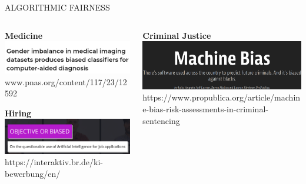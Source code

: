 \documentclass[11pt,compress,t,notes=noshow, xcolor=table]{beamer}
\begin{document}
\begin{vbframe}{ALGORITHMIC FAIRNESS}
    \begin{columns}
        \begin{column}{0.5\textwidth}
            \begin{center}
            \vspace{-0.5cm}

            \textbf{Medicine}
            \includegraphics[height=0.2\textheight]{figures/gender_imbalance.png}
            \tiny{www.pnas.org/content/117/23/12592}
            \vspace{1.5cm}

            \textbf{Hiring}
            \includegraphics[height=0.2\textheight]{figures/hiring.png}
            \tiny{https://interaktiv.br.de/ki-bewerbung/en/}
            \end{center}
        \end{column}
        
        \begin{column}{0.5\textwidth}
            \begin{center}
                \vspace{-0.5cm}
            
                \textbf{Criminal Justice}
                \includegraphics[height=0.2\textheight]{figures/compas.png}
                \tiny{{https://www.propublica.org/article/machine-bias-risk-assessments-in-criminal-sentencing}}
                \vspace{1.5cm}
    

\end{center}
\end{column}
\end{columns}
\end{vbframe}
\end{document}
